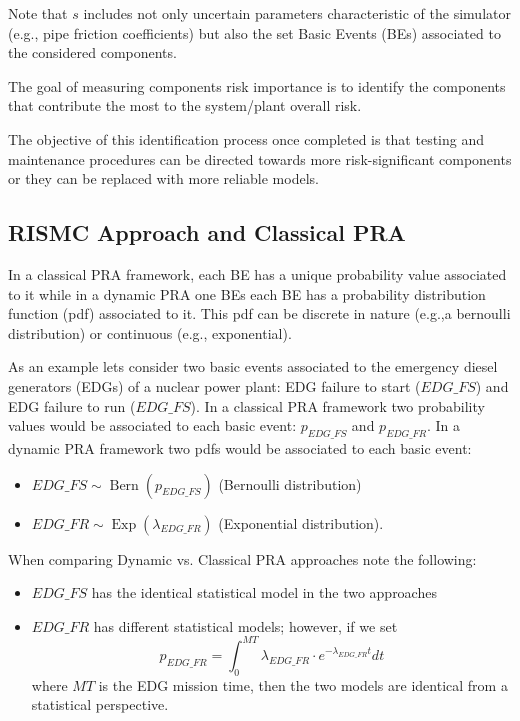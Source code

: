 Note that $s$ includes not only uncertain parameters
characteristic of the simulator (e.g., pipe friction coefficients) but also the set Basic Events (BEs)
associated to the considered components. 

The goal of measuring components risk importance is to identify the components that contribute the most
to the system/plant overall risk.

The objective of this identification process once completed is that testing and maintenance 
procedures can be directed towards more risk-significant components or they can be replaced with more 
reliable models.


\subsection{RISMC Approach and Classical PRA}
\label{sec:analogy}

In a classical PRA framework, each BE has a unique probability value 
associated to it while in a dynamic PRA one BEs each BE has a probability distribution function (pdf) 
associated to it.
This pdf can be discrete in nature (e.g.,a bernoulli distribution) or continuous (e.g., exponential).

As an example lets consider two basic events associated to the emergency diesel generators (EDGs) of 
a nuclear power plant: EDG failure to start ($EDG\_FS$) and EDG failure to run ($EDG\_FS$).
In a classical PRA framework two probability values would be associated to each basic event: $p_{EDG\_FS}$ and 
$p_{EDG\_FR}$.
In a dynamic PRA framework two pdfs would be associated to each basic event:
\begin{itemize}
  \item $EDG\_FS \sim \operatorname{Bern}(p_{EDG\_FS})$ (Bernoulli distribution)
  \item $EDG\_FR \sim \operatorname{Exp}(\lambda_{EDG\_FR})$ (Exponential distribution).
\end{itemize}
When comparing Dynamic vs. Classical PRA approaches note the following:
\begin{itemize}
  \item $EDG\_FS$ has the identical statistical model in the two approaches
  \item $EDG\_FR$ has different statistical models; however, if we set 
        \begin{equation}
          p_{EDG\_FR} = \int_0^{MT} \lambda_{EDG\_FR} \cdot e^{-\lambda_{EDG\_FR} t} dt
          \label{fig:contDiscAnalogy}
        \end{equation}
        where $MT$ is the EDG mission time, then the two models are identical from a 
        statistical perspective.
\end{itemize}


